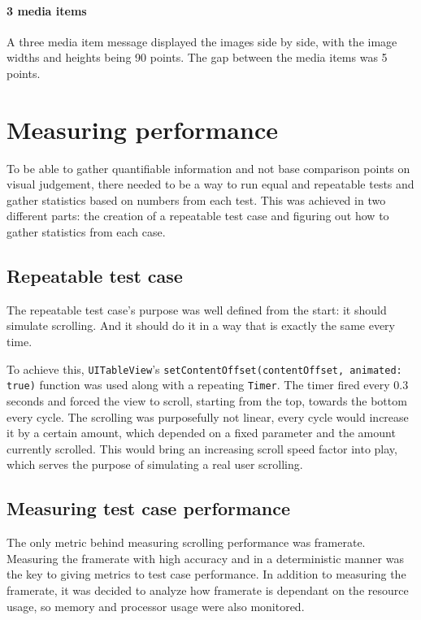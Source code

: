 \documentclass[a4paper,12pt]{article}
\begin{document}
\paragraph*{3 media items}
A three media item message displayed the images side by side, with the image widths and heights being 90 points. The gap between the media items was 5 points.

\newpage
\section{Measuring performance}
To be able to gather quantifiable information and not base comparison points on visual judgement, there needed to be a way to run equal and repeatable tests and gather statistics based on numbers from each test. This was achieved in two different parts: the creation of a repeatable test case and figuring out how to gather statistics from each case.

\subsection{Repeatable test case}
The repeatable test case's purpose was well defined from the start: it should simulate scrolling. And it should do it in a way that is exactly the same every time.

To achieve this, \texttt{UITableView}'s \texttt{setContentOffset(contentOffset, animated: true)} function was used along with a repeating \texttt{Timer}. The timer fired every 0.3 seconds and forced the view to scroll, starting from the top, towards the bottom every cycle. The scrolling was purposefully not linear, every cycle would increase it by a certain amount, which depended on a fixed parameter and the amount currently scrolled. This would bring an increasing scroll speed factor into play, which serves the purpose of simulating a real user scrolling.

\subsection{Measuring test case performance}
The only metric behind measuring scrolling performance was framerate. Measuring the framerate with high accuracy and in a deterministic manner was the key to giving metrics to test case performance. In addition to measuring the framerate, it was decided to analyze how framerate is dependant on the resource usage, so memory and processor usage were also monitored.
\end{document}
